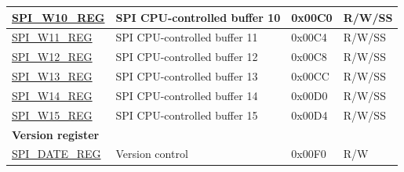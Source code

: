 \begin{longtable}{ | p{6cm} | p{7.2cm} | p{1.3cm} | p{1cm} | }
\hyperref[regdesc:SPIW10REG]{SPI\_W10\_REG} & SPI CPU-controlled buffer 10 & 0x00C0 & R/W/SS \\ \hline
\hyperref[regdesc:SPIW11REG]{SPI\_W11\_REG} & SPI CPU-controlled buffer 11 & 0x00C4 & R/W/SS \\ \hline
\hyperref[regdesc:SPIW12REG]{SPI\_W12\_REG} & SPI CPU-controlled buffer 12 & 0x00C8 & R/W/SS \\ \hline
\hyperref[regdesc:SPIW13REG]{SPI\_W13\_REG} & SPI CPU-controlled buffer 13 & 0x00CC & R/W/SS \\ \hline
\hyperref[regdesc:SPIW14REG]{SPI\_W14\_REG} & SPI CPU-controlled buffer 14 & 0x00D0 & R/W/SS \\ \hline
\hyperref[regdesc:SPIW15REG]{SPI\_W15\_REG} & SPI CPU-controlled buffer 15 & 0x00D4 & R/W/SS \\ \hline
\multicolumn{4}{|l|}{\textbf{Version register}} \\ \hline
\hyperref[regdesc:SPIDATEREG]{SPI\_DATE\_REG} & Version control & 0x00F0 & R/W \\ \hline
\end{longtable}
